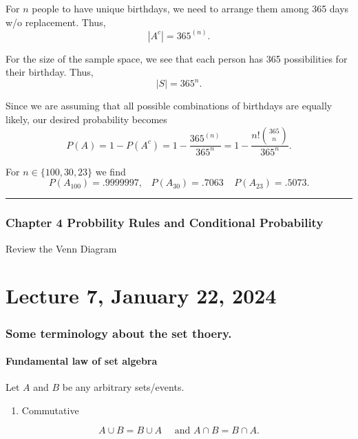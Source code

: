 \documentclass[
]{book}
\providecommand{\tightlist}{%
  \setlength{\itemsep}{0pt}\setlength{\parskip}{0pt}}
\theoremstyle{definition}
\theoremstyle{definition}
\theoremstyle{definition}
\theoremstyle{definition}
\theoremstyle{remark}
\begin{document}
For \(n\) people to have unique birthdays, we need to arrange them among 365 days w/o replacement. Thus,
\[|A^c| = 365^{(n)}.\]

For the size of the sample space, we see that each person has 365 possibilities for their birthday. Thus,
\[|S| = 365^n.\]

Since we are assuming that all possible combinations of birthdays are equally likely, our desired probability becomes
\[
P(A) = 1 - P(A^c) = 1 - \frac{365^{(n)}}{365^n} = 1 - \frac{n! {365 \choose n}}{365^n}.
\]

For \(n\in\{100, 30, 23\}\) we find
\[P(A_{100})= .9999997,\;\;\; P(A_{30})=.7063 \;\;\;\; P(A_{23})=.5073.\]

\begin{center}\rule{0.5\linewidth}{0.5pt}\end{center}

\subsection{Chapter 4 Probbility Rules and Conditional Probability}\label{chapter-4-probbility-rules-and-conditional-probability}

Review the Venn Diagram

\chapter{Lecture 7, January 22, 2024}\label{lecture-7-january-22-2024}

\subsection{Some terminology about the set thoery.}\label{some-terminology-about-the-set-thoery.}

\subsubsection{Fundamental law of set algebra}\label{fundamental-law-of-set-algebra}

Let \(A\) and \(B\) be any arbitrary sets/events.

\begin{enumerate}
\def\labelenumi{\arabic{enumi}.}
\tightlist
\item
  Commutative
\end{enumerate}

\[
  A\cup B = B\cup A \quad \text{ and } A\cap B = B\cap A.
\]
\end{document}
